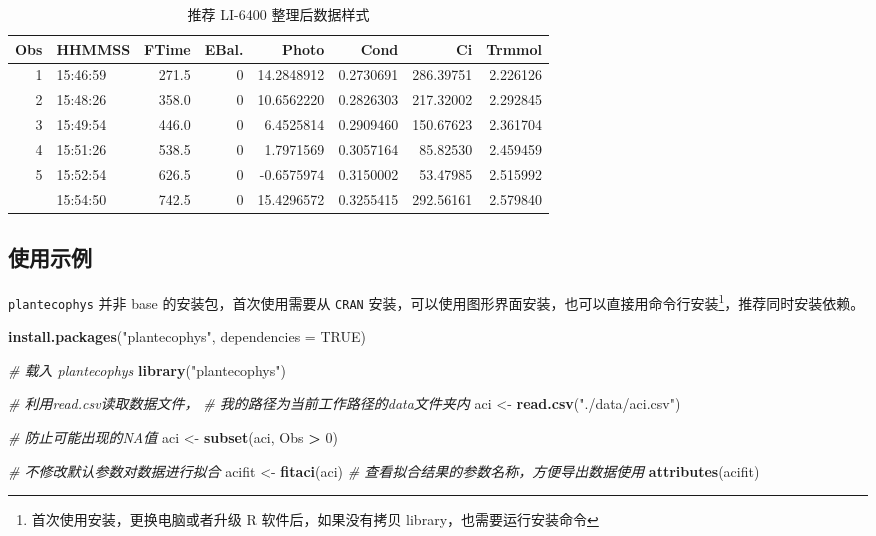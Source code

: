 \documentclass[]{krantz}
\makeatletter
\newenvironment{Shaded}{\begin{snugshade}}{\end{snugshade}}
\newcommand{\KeywordTok}[1]{\textcolor[rgb]{0.13,0.29,0.53}{\textbf{#1}}}
\newcommand{\DataTypeTok}[1]{\textcolor[rgb]{0.13,0.29,0.53}{#1}}
\newcommand{\DecValTok}[1]{\textcolor[rgb]{0.00,0.00,0.81}{#1}}
\newcommand{\StringTok}[1]{\textcolor[rgb]{0.31,0.60,0.02}{#1}}
\newcommand{\CommentTok}[1]{\textcolor[rgb]{0.56,0.35,0.01}{\textit{#1}}}
\newcommand{\OtherTok}[1]{\textcolor[rgb]{0.56,0.35,0.01}{#1}}
\newcommand{\OperatorTok}[1]{\textcolor[rgb]{0.81,0.36,0.00}{\textbf{#1}}}
\newcommand{\NormalTok}[1]{#1}
\newenvironment{kframe}{%
\medskip{}
\setlength{\fboxsep}{.8em}
 \def\at@end@of@kframe{}%
 \ifinner\ifhmode%
  \def\at@end@of@kframe{\end{minipage}}%
  \begin{minipage}{\columnwidth}%
 \fi\fi%
 \def\FrameCommand##1{\hskip\@totalleftmargin \hskip-\fboxsep
 \colorbox{shadecolor}{##1}\hskip-\fboxsep
     \hskip-\linewidth \hskip-\@totalleftmargin \hskip\columnwidth}%
 \MakeFramed {\advance\hsize-\width
   \@totalleftmargin\z@ \linewidth\hsize
   \@setminipage}}%
 {\par\unskip\endMakeFramed%
 \at@end@of@kframe}
\renewenvironment{Shaded}{\begin{kframe}}{\end{kframe}}
\theoremstyle{definition}
\theoremstyle{definition}
\theoremstyle{definition}
\theoremstyle{remark}
\makeatother
\begin{document}
\begin{longtable}{rlrrrrrr}
\caption{\label{tab:head6400}推荐 LI-6400 整理后数据样式}\\
\toprule
Obs & HHMMSS & FTime & EBal. & Photo & Cond & Ci & Trmmol\\
\midrule
1 & 15:46:59 & 271.5 & 0 & 14.2848912 & 0.2730691 & 286.39751 & 2.226126\\
2 & 15:48:26 & 358.0 & 0 & 10.6562220 & 0.2826303 & 217.32002 & 2.292845\\
3 & 15:49:54 & 446.0 & 0 & 6.4525814 & 0.2909460 & 150.67623 & 2.361704\\
4 & 15:51:26 & 538.5 & 0 & 1.7971569 & 0.3057164 & 85.82530 & 2.459459\\
5 & 15:52:54 & 626.5 & 0 & -0.6575974 & 0.3150002 & 53.47985 & 2.515992\\
\addlinespace
6 & 15:54:50 & 742.5 & 0 & 15.4296572 & 0.3255415 & 292.56161 & 2.579840\\
\bottomrule
\end{longtable}

\subsection{使用示例}\label{fitaci-p}

\texttt{plantecophys} 并非 base 的安装包，首次使用需要从 \texttt{CRAN}
安装，可以使用图形界面安装，也可以直接用命令行安装\footnote{首次使用安装，更换电脑或者升级
  R 软件后，如果没有拷贝 library，也需要运行安装命令}，推荐同时安装依赖。

\begin{Shaded}
\begin{Highlighting}[]
\KeywordTok{install.packages}\NormalTok{(}\StringTok{"plantecophys"}\NormalTok{, }\DataTypeTok{dependencies =} \OtherTok{TRUE}\NormalTok{)}
\end{Highlighting}
\end{Shaded}

\begin{Shaded}
\begin{Highlighting}[]
\CommentTok{# 载入 plantecophys }
\KeywordTok{library}\NormalTok{(}\StringTok{"plantecophys"}\NormalTok{)}

\CommentTok{# 利用read.csv读取数据文件，}
\CommentTok{# 我的路径为当前工作路径的data文件夹内}
\NormalTok{aci <-}\StringTok{ }\KeywordTok{read.csv}\NormalTok{(}\StringTok{"./data/aci.csv"}\NormalTok{)}

\CommentTok{# 防止可能出现的NA值}
\NormalTok{aci <-}\StringTok{ }\KeywordTok{subset}\NormalTok{(aci, Obs }\OperatorTok{>}\StringTok{ }\DecValTok{0}\NormalTok{)}

\CommentTok{# 不修改默认参数对数据进行拟合}
\NormalTok{acifit <-}\StringTok{ }\KeywordTok{fitaci}\NormalTok{(aci)}
\CommentTok{# 查看拟合结果的参数名称，方便导出数据使用}
\KeywordTok{attributes}\NormalTok{(acifit)}
\end{Highlighting}
\end{Shaded}
\end{document}
